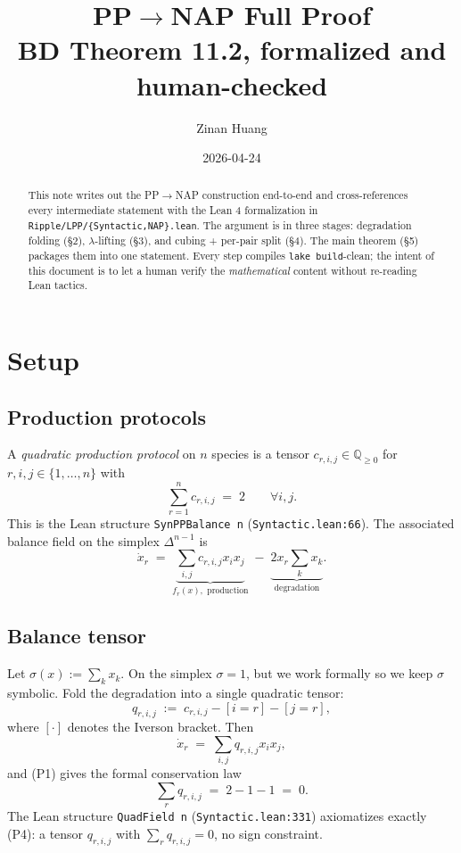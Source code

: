 \documentclass[11pt]{article}
\title{PP$\to$NAP Full Proof\\
\large BD Theorem 11.2, formalized and human-checked}
\author{Zinan Huang}
\date{2026-04-24}
\newcommand{\Q}{\mathbb{Q}}
\begin{document}
\maketitle

\begin{abstract}
This note writes out the PP$\to$NAP construction end-to-end and
cross-references every intermediate statement with the Lean 4 formalization
in \texttt{Ripple/LPP/\{Syntactic,NAP\}.lean}.
The argument is in three stages: degradation folding (\S2), $\lambda$-lifting
(\S3), and cubing + per-pair split (\S4). The main theorem (\S5) packages
them into one statement. Every step compiles \texttt{lake build}-clean; the
intent of this document is to let a human verify the \emph{mathematical}
content without re-reading Lean tactics.
\end{abstract}

\section{Setup}

\subsection{Production protocols}
A \emph{quadratic production protocol} on $n$ species is a tensor
$c_{r,i,j} \in \Q_{\ge 0}$ for $r, i, j \in \{1, \dots, n\}$ with
\begin{equation}
    \sum_{r=1}^n c_{r,i,j} \;=\; 2 \qquad \forall i, j.
    \tag{P1}
\end{equation}
This is the Lean structure \verb|SynPPBalance n| (\texttt{Syntactic.lean:66}).
The associated balance field on the simplex $\Delta^{n-1}$ is
\begin{equation}
    \dot x_r \;=\; \underbrace{\sum_{i,j} c_{r,i,j} x_i x_j}_{f_r(x), \text{ production}}
        \;-\; \underbrace{2 x_r \sum_{k} x_k}_{\text{degradation}}.
    \tag{P2}
\end{equation}

\subsection{Balance tensor}
Let $\sigma(x) := \sum_k x_k$. On the simplex $\sigma = 1$, but we work
formally so we keep $\sigma$ symbolic. Fold the degradation into a single
quadratic tensor:
\begin{equation}
    q_{r,i,j} \;:=\; c_{r,i,j} - [i=r] - [j=r],
\end{equation}
where $[\cdot]$ denotes the Iverson bracket. Then
\begin{equation}
    \dot x_r \;=\; \sum_{i,j} q_{r,i,j} x_i x_j,
    \tag{P3}
\end{equation}
and (P1) gives the formal conservation law
\begin{equation}
    \sum_{r} q_{r,i,j} \;=\; 2 - 1 - 1 \;=\; 0.
    \tag{P4}
\end{equation}
The Lean structure \verb|QuadField n| (\texttt{Syntactic.lean:331})
axiomatizes exactly (P4): a tensor $q_{r,i,j}$ with
$\sum_r q_{r,i,j} = 0$, no sign constraint.
\end{document}

